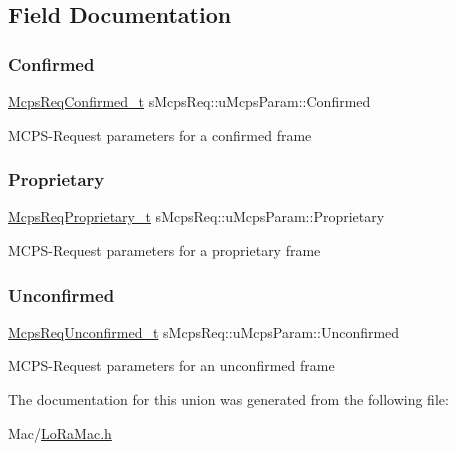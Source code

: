 \subsection{Field Documentation}
\mbox{\label{unionsMcpsReq_1_1uMcpsParam_a55f25abc41d07654f0ed8a92541a1eef}} 
\subsubsection{\texorpdfstring{Confirmed}{Confirmed}}
{\footnotesize\ttfamily \hyperlink{group__LORAMAC_ga02103c0ee1374a6b1eec217f148ec0e2}{Mcps\+Req\+Confirmed\+\_\+t} s\+Mcps\+Req\+::u\+Mcps\+Param\+::\+Confirmed}

M\+C\+P\+S-\/\+Request parameters for a confirmed frame \mbox{\label{unionsMcpsReq_1_1uMcpsParam_a894cf87a04261fa298cde47fc50ac02d}} 
\subsubsection{\texorpdfstring{Proprietary}{Proprietary}}
{\footnotesize\ttfamily \hyperlink{group__LORAMAC_gac856bc282e89301412e0a294b3e663c4}{Mcps\+Req\+Proprietary\+\_\+t} s\+Mcps\+Req\+::u\+Mcps\+Param\+::\+Proprietary}

M\+C\+P\+S-\/\+Request parameters for a proprietary frame \mbox{\label{unionsMcpsReq_1_1uMcpsParam_a2aae1e6bd0891c17e9bc2654ae95e60a}} 
\subsubsection{\texorpdfstring{Unconfirmed}{Unconfirmed}}
{\footnotesize\ttfamily \hyperlink{group__LORAMAC_gaab871b914dfa4013c176586dcc2ea6df}{Mcps\+Req\+Unconfirmed\+\_\+t} s\+Mcps\+Req\+::u\+Mcps\+Param\+::\+Unconfirmed}

M\+C\+P\+S-\/\+Request parameters for an unconfirmed frame 

The documentation for this union was generated from the following file\+:\begin{DoxyCompactItemize}
\item 
Mac/\hyperlink{LoRaMac_8h}{Lo\+Ra\+Mac.\+h}\end{DoxyCompactItemize}

